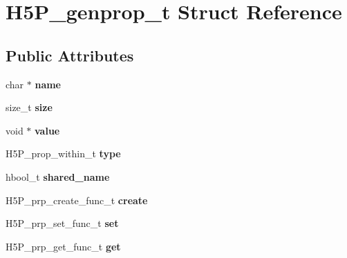 \hypertarget{struct_h5_p__genprop__t}{}\section{H5\+P\+\_\+genprop\+\_\+t Struct Reference}
\label{struct_h5_p__genprop__t}
\subsection*{Public Attributes}
\begin{DoxyCompactItemize}
\item 
\mbox{\label{struct_h5_p__genprop__t_af5b536ebf7927253a4c4b491bdbcb652}} 
char $\ast$ {\bfseries name}
\item 
\mbox{\label{struct_h5_p__genprop__t_ac56b41b951ac25f4929b07f3c2b58d9b}} 
size\+\_\+t {\bfseries size}
\item 
\mbox{\label{struct_h5_p__genprop__t_a8919e3d5285060404b5c68a2171e5c95}} 
void $\ast$ {\bfseries value}
\item 
\mbox{\label{struct_h5_p__genprop__t_aa0c0d5b21fad1d9b9ade478741f4eb41}} 
H5\+P\+\_\+prop\+\_\+within\+\_\+t {\bfseries type}
\item 
\mbox{\label{struct_h5_p__genprop__t_a55dc994b7076a7566e3a5416aecb75cc}} 
hbool\+\_\+t {\bfseries shared\+\_\+name}
\item 
\mbox{\label{struct_h5_p__genprop__t_a8559d59b415641d9ee11ad9ded385a6d}} 
H5\+P\+\_\+prp\+\_\+create\+\_\+func\+\_\+t {\bfseries create}
\item 
\mbox{\label{struct_h5_p__genprop__t_a791185c360b13d7ecd1433b22339f3a7}} 
H5\+P\+\_\+prp\+\_\+set\+\_\+func\+\_\+t {\bfseries set}
\item 
\mbox{\label{struct_h5_p__genprop__t_a5ddcd2a45f74ad718a987ac2f3000cde}} 
H5\+P\+\_\+prp\+\_\+get\+\_\+func\+\_\+t {\bfseries get}
\item 
\mbox{\label{struct_h5_p__genprop__t_a32e142d7b4869a42cf127e9022f51c87}} 

\end{DoxyCompactItemize}
